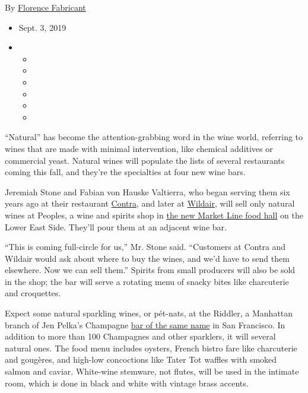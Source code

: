 By
\href{https://www.nytimes3xbfgragh.onion/by/florence-fabricant}{Florence
Fabricant}

\begin{itemize}
\item
  Sept. 3, 2019
\item
  \begin{itemize}
  \item
  \item
  \item
  \item
  \item
  \item
  \end{itemize}
\end{itemize}

``Natural'' has become the attention-grabbing word in the wine world,
referring to wines that are made with minimal intervention, like
chemical additives or commercial yeast. Natural wines will populate the
lists of several restaurants coming this fall, and they're the
specialties at four new wine bars.

Jeremiah Stone and Fabian von Hauske Valtierra, who began serving them
six years ago at their restaurant
\href{https://www.nytimes3xbfgragh.onion/2014/03/12/dining/restaurant-review-contra-on-the-lower-east-side.html?module=inline}{Contra},
and later at
\href{https://www.nytimes3xbfgragh.onion/2015/10/07/dining/restaurant-review-wildair-on-the-lower-east-side.html}{Wildair},
will sell only natural wines at Peoples, a wine and spirits shop in
\href{https://www.nytimes3xbfgragh.onion/2019/09/03/dining/food-halls-nyc.html}{the
new Market Line food hall} on the Lower East Side. They'll pour them at
an adjacent wine bar.

``This is coming full-circle for us,'' Mr. Stone said. ``Customers at
Contra and Wildair would ask about where to buy the wines, and we'd have
to send them elsewhere. Now we can sell them.'' Spirits from small
producers will also be sold in the shop; the bar will serve a rotating
menu of snacky bites like charcuterie and croquettes.

Expect some natural sparkling wines, or pét-nats, at the Riddler, a
Manhattan branch of Jen Pelka's Champagne
\href{https://www.theriddlersf.com/}{bar of the same name} in San
Francisco. In addition to more than 100 Champagnes and other sparklers,
it will several natural ones. The food menu includes oysters, French
bistro fare like charcuterie and gougères, and high-low concoctions like
Tater Tot waffles with smoked salmon and caviar. White-wine stemware,
not flutes, will be used in the intimate room, which is done in black
and white with vintage brass accents.

